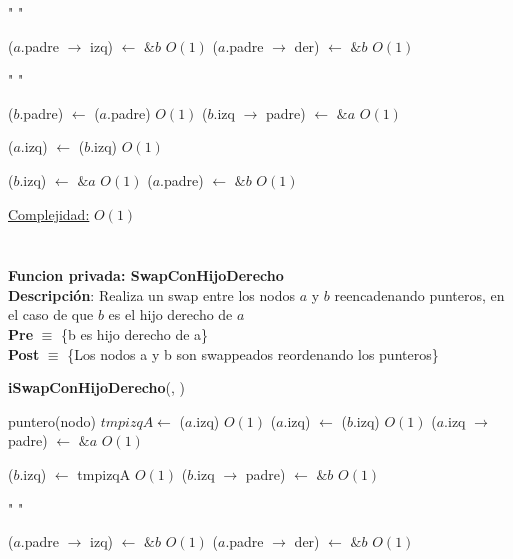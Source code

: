 \begin{Algoritmos}
\begin{algorithm}[H]
\begin{algorithmic}[1]
    \State " "

        \State ($a$.padre $\to$ izq) $\gets$ $\&b$ \Comment $O(1)$
    \Else {}
        \State ($a$.padre $\to$ der) $\gets$ $\&b$ \Comment $O(1)$
    \EndIf
    \EndIf
    
    \State " "

    \State ($b$.padre) $\gets$ ($a$.padre) \Comment $O(1)$
        \State ($b$.izq $\to$ padre) $\gets$ $\&a$ \Comment $O(1)$
    \EndIf
    
    \State ($a$.izq) $\gets$ ($b$.izq) \Comment $O(1)$
    
    \State ($b$.izq) $\gets$ $\&a$ \Comment $O(1)$
    \State ($a$.padre) $\gets$ $\&b$ \Comment $O(1)$


    \medskip
    \Statex \underline{Complejidad:} $O(1)$

\end{algorithmic}
\end{algorithm}

$ $\newline


$ $\newline

\textbf{Funcion privada: SwapConHijoDerecho}\\
\textbf{Descripci\'on}: Realiza un swap entre los nodos $a$ y $b$ reencadenando punteros, en el caso de que $b$ es el hijo derecho de $a$\\ 
\textbf{Pre} $\equiv$ \{b es hijo derecho de a\}\\%
\textbf{Post} $\equiv$ \{Los nodos a y b son swappeados reordenando los punteros\}%
\begin{algorithm}[H]
{\textbf{iSwapConHijoDerecho}(, )}
\begin{algorithmic}[1]

    \State puntero(nodo) $tmpizqA \gets$ ($a$.izq) \Comment $O(1)$
    \State ($a$.izq) $\gets$ ($b$.izq)  \Comment $O(1)$
        \State ($a$.izq $\to$ padre) $\gets$ $\&a$ \Comment $O(1)$
    \EndIf

    \State ($b$.izq) $\gets$ tmpizqA  \Comment $O(1)$
        \State ($b$.izq $\to$ padre) $\gets$ $\&b$  \Comment $O(1)$
    \EndIf
    
    \State " "

        \State ($a$.padre $\to$ izq) $\gets$ $\&b$ \Comment $O(1)$
    \Else {}
        \State ($a$.padre $\to$ der) $\gets$ $\&b$ \Comment $O(1)$
    \EndIf
    \EndIf
    

\end{algorithmic}
\end{algorithm}
\end{Algoritmos}
